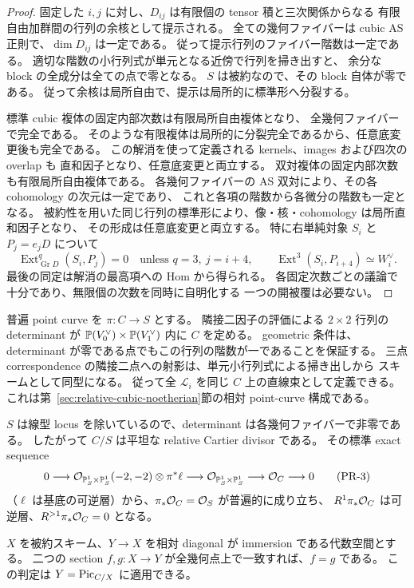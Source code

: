 \begin{proof}
固定した $i,j$ に対し、$D_{ij}$ は有限個の tensor 積と三次関係からなる
有限自由加群間の行列の余核として提示される。
全ての幾何ファイバーは cubic AS 正則で、$\dim D_{ij}$ は一定である。
従って提示行列のファイバー階数は一定である。
適切な階数の小行列式が単元となる近傍で行列を掃き出すと、
余分な block の全成分は全ての点で零となる。
$S$ は被約なので、その block 自体が零である。
従って余核は局所自由で、提示は局所的に標準形へ分裂する。

標準 cubic 複体の固定内部次数は有限局所自由複体となり、
全幾何ファイバーで完全である。
そのような有限複体は局所的に分裂完全であるから、任意底変更後も完全である。
この解消を使って定義される kernels、images および四次の overlap も
直和因子となり、任意底変更と両立する。
双対複体の固定内部次数も有限局所自由複体である。
各幾何ファイバーの AS 双対により、その各 cohomology の次元は一定であり、
これと各項の階数から各微分の階数も一定となる。
被約性を用いた同じ行列の標準形により、像・核・cohomology は局所直和因子となり、
その形成は任意底変更と両立する。
特に右単純対象 $S_i$ と $P_j=e_jD$ について
\[
 \operatorname{Ext}^q_{\operatorname{Gr}D}(S_i,P_j)=0
 \quad\text{unless }q=3,\ j=i+4,
 \qquad
 \operatorname{Ext}^3(S_i,P_{i+4})\simeq W_i^\vee.
\]
最後の同定は解消の最高項への Hom から得られる。
各固定次数ごとの議論で十分であり、無限個の次数を同時に自明化する
一つの開被覆は必要ない。
\end{proof}

普遍 point curve を $\pi:C\to S$ とする。
隣接二因子の評価による $2\times2$ 行列の determinant が
$\mathbb P(V_0^\vee)\times\mathbb P(V_1^\vee)$ 内に $C$ を定める。
geometric 条件は、determinant が零である点でもこの行列の階数が一であることを保証する。
三点 correspondence の隣接二点への射影は、単元小行列式による掃き出しから
スキームとして同型になる。
従って全 $\mathcal L_i$ を同じ $C$ 上の直線束として定義できる。
これは第~\ref{sec:relative-cubic-noetherian}節の相対 point-curve 構成である。

$S$ は線型 locus を除いているので、determinant は各幾何ファイバーで非零である。
したがって $C/S$ は平坦な relative Cartier divisor である。
その標準 exact sequence
\[
 0\longrightarrow\mathcal O_{\mathbb P^1_S\times\mathbb P^1_S}(-2,-2)\otimes\pi^*\ell
 \longrightarrow\mathcal O_{\mathbb P^1_S\times\mathbb P^1_S}
 \longrightarrow\mathcal O_C\longrightarrow0
 \tag{PR-3}\label{eq:curve-sequence}
\]
（$\ell$ は基底の可逆層）から、$\pi_*\mathcal O_C=\mathcal O_S$ が普遍的に成り立ち、
$R^1\pi_*\mathcal O_C$ は可逆層、$R^{>1}\pi_*\mathcal O_C=0$ となる。

\begin{lemma}\label{lem:reduced-equalizer}
$X$ を被約スキーム、$Y\to X$ を相対 diagonal が immersion である代数空間とする。
二つの section $f,g:X\to Y$ が全幾何点上で一致すれば、$f=g$ である。
この判定は $Y=\operatorname{Pic}_{C/X}$ に適用できる。
\end{lemma}


